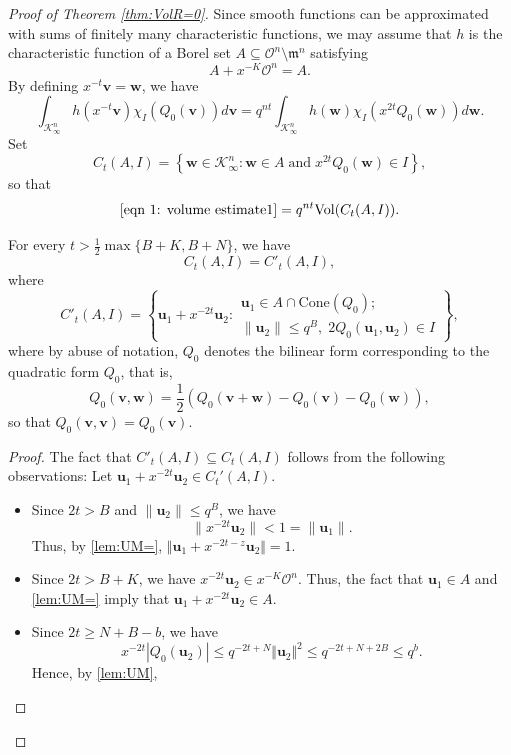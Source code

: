 \documentclass[10pt,a4paper]{amsart}
\def\vol{\mathrm{Vol}}
\newcommand{\Cone}{\mathrm{Cone}}
\begin{document}
\begin{proof}[Proof of Theorem \ref{thm:VolR=0}]
Since smooth functions can be approximated with sums of finitely many characteristic functions, we may assume that $h$ is the characteristic function of a Borel set $A\subseteq \mathcal{O}^n\setminus \mathfrak{m}^n$ satisfying
$$A+x^{-K}\mathcal{O}^n=A.$$
By defining $x^{-t}\mathbf v=\mathbf w$, we have
\begin{equation}\label{eqn 1: volume estimate1}
\int_{\mathcal K_\infty^n} h(x^{-t}\mathbf v) \chi^{}_I(Q_0(\mathbf v)) d\mathbf v
=q^{nt}\int_{\mathcal K_\infty^n} h(\mathbf w) \chi^{}_I(x^{2t}Q_0(\mathbf w)) d\mathbf w.
\end{equation}
Set
\[
C_t(A,I)=\left\{\mathbf w\in \mathcal K_\infty^n: \mathbf w \in A\;\text{and}\;  x^{2t}Q_0(\mathbf w)\in I\right\},
\]
so that
\[
\eqref{eqn 1: volume estimate1}= q^{nt} \vol(C_t(A,I)).
\]
\begin{claim}
For every $t>\frac{1}{2}\max\{B+K, B+N\}$, we have
\[
C_t(A,I)=C'_t(A,I),
\]
where
\[
C'_t(A,I)=\left\{\mathbf u_1+ x^{-2t} \mathbf u_2: \begin{array}{c}
\mathbf u_1\in A\cap \Cone(Q_0);\\[0.05in]
\|\mathbf u_2\|\le q^B,\; 2Q_0(\mathbf u_1, \mathbf u_2)\in I
\end{array}\right\},
\]
where by abuse of notation, $Q_0$ denotes the bilinear form corresponding to the quadratic form $Q_0$, that is, $$Q_0(\mathbf v, \mathbf w)=\frac 1 2\left(Q_0(\mathbf v+\mathbf w)-Q_0(\mathbf v)-Q_0(\mathbf w)\right),$$
so that $Q_0(\mathbf{v},\mathbf{v})=Q_0(\mathbf{v})$.
\end{claim}
\begin{proof}
The fact that $C'_t(A,I) \subseteq C_t(A,I)$ follows from the following observations: Let $\mathbf{u}_1+x^{-2t}\mathbf{u}_2\in C_t'(A,I)$.
\begin{itemize}
\item Since $2t>B$ and $\|\mathbf u_2\|\le q^B$, we have 
\[\|x^{-2t} \mathbf u_2\|<1=\|\mathbf u_1\|.\] 
Thus, by \eqref{lem:UM=}, $\Vert \mathbf{u}_1+x^{-2t-z}\mathbf{u}_2\Vert=1$.
\vspace{1pt}
\item Since $2t> B+K$, we have $x^{-2t}\mathbf u_2 \in x^{-K}\mathcal O^n$. Thus, the fact that $\mathbf{u}_1\in A$ and \eqref{lem:UM=} imply that $\mathbf{u}_1+x^{-2t}\mathbf{u}_2\in A$. 
\vspace{1pt}
\item Since $2t\geq N+B-b$, we have 
$$x^{-2t}|Q_0(\mathbf u_2)|\leq q^{-2t+N}\Vert \mathbf{u}_2\Vert^2\le q^{-2t+N+2B}\le q^b.$$ Hence, by \eqref{lem:UM},

\end{itemize}
\end{proof}
\end{proof}
\end{document}
